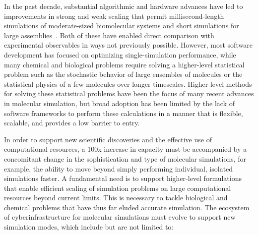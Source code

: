 \documentclass[10pt,letterpaper,draft]{article}
\begin{document}
{\noindent In} the past decade, substantial algorithmic and hardware advances have led to
improvements in strong and weak scaling that permit millisecond-length
simulations of moderate-sized biomolecular systems and short simulations for
large assemblies~\cite{kasson2}.  Both of these have enabled direct comparison with
experimental observables in ways not previously possible.  However, most
software development has focused on optimizing single-simulation performance,
while many chemical and biological problems require solving a higher-level
statistical problem such as the stochastic behavior of large ensembles of
molecules or the statistical physics of a few molecules over longer timescales.
Higher-level methods for solving these statistical problems have been the focus
of many recent advances in molecular simulation, but broad adoption has been
limited by the lack of software frameworks to perform these calculations in a
manner that is flexible, scalable, and provides a low barrier to entry.

In order to support new scientific discoveries and the effective use of
computational resources, a 100x increase in capacity must be accompanied by a
concomitant change in the sophistication and type of molecular simulations, for
example, the ability to move beyond simply performing individual, isolated
simulations faster. A fundamental need is to support higher-level formulations
that enable efficient scaling of simulation problems on large computational
resources beyond current limits.  This is necessary to tackle biological and
chemical problems that have thus far eluded accurate simulation.  The ecosystem
of cyberinfrastructure for molecular simulations must evolve to support new
simulation modes, which include but are not limited to:
\end{document}
